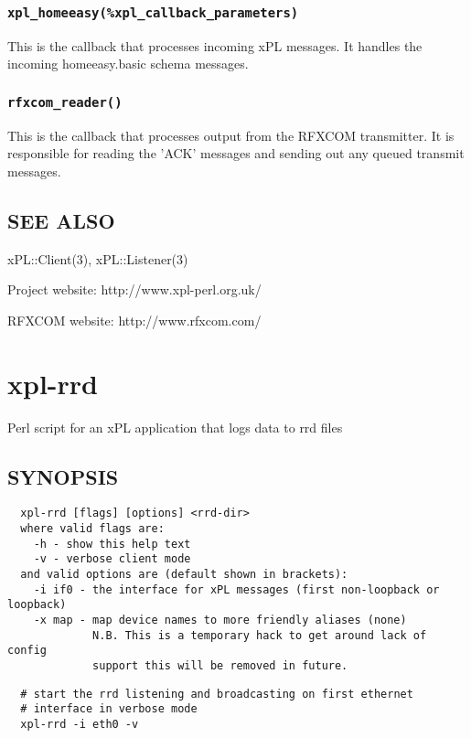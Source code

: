 \documentclass[12pt,a4paper]{article}
\begin{document}
\subsubsection*{\texttt{xpl\_homeeasy(\%xpl\_callback\_parameters)}\label{xpl-rfxcom-trans_xpl_homeeasy_xpl_callback_parameters_}}


This is the callback that processes incoming xPL messages.  It handles
the incoming homeeasy.basic schema messages.

\subsubsection*{\texttt{rfxcom\_reader()}\label{xpl-rfxcom-trans_rfxcom_reader_}}


This is the callback that processes output from the RFXCOM transmitter.
It is responsible for reading the 'ACK' messages and sending out any
queued transmit messages.

\subsection*{SEE ALSO\label{xpl-rfxcom-trans_SEE_ALSO}}


xPL::Client(3), xPL::Listener(3)



Project website: http://www.xpl-perl.org.uk/



RFXCOM website: http://www.rfxcom.com/

\newpage
\section{xpl-rrd\label{xpl-rrd}}


Perl script for an xPL application that logs data to rrd files

\subsection*{SYNOPSIS\label{xpl-rrd_SYNOPSIS}}
\begin{verbatim}
  xpl-rrd [flags] [options] <rrd-dir>
  where valid flags are:
    -h - show this help text
    -v - verbose client mode
  and valid options are (default shown in brackets):
    -i if0 - the interface for xPL messages (first non-loopback or loopback)
    -x map - map device names to more friendly aliases (none)
             N.B. This is a temporary hack to get around lack of config
             support this will be removed in future.
\end{verbatim}
\begin{verbatim}
  # start the rrd listening and broadcasting on first ethernet
  # interface in verbose mode
  xpl-rrd -i eth0 -v
\end{verbatim}
\end{document}
